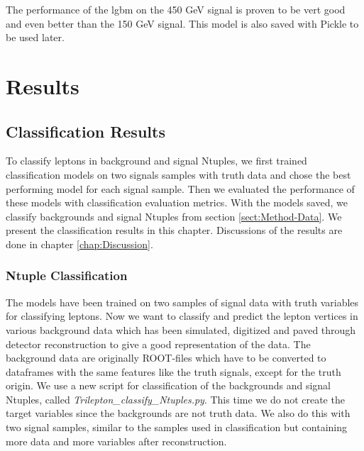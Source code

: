 \documentclass[a4paper, american, 12pt]{report}
\begin{document}
	The performance of the \acrshort{lgbm} on the 450 GeV signal is proven to be vert good and even better than the 150 GeV signal. This model is also saved with Pickle to be used later.



	\part{Results}
	\label{part:Results} 
	
	\chapter{Classification Results}
	\label{chap:Result-ClassResult}
	To classify leptons in background and signal Ntuples, we first trained classification models on two signals samples with truth data and chose the best performing model for each signal sample. Then we evaluated the performance of these models with classification evaluation metrics. With the models saved, we classify backgrounds and signal Ntuples from section \ref{sect:Method-Data}. We present the classification results in this chapter. Discussions of the results are done in chapter \ref{chap:Discussion}.
	
	
	\section{Ntuple Classification} 
	\label{sect:Result-BkgClass}
	The models have been trained on two samples of signal data with truth variables for classifying leptons. Now we want to classify and predict the lepton vertices in various background data which has been simulated, digitized and paved through detector reconstruction to give a good representation of the data. The background data are originally ROOT-files which have to be converted to dataframes with the same features like the truth signals, except for the truth origin. We use a new script for classification of the backgrounds and signal Ntuples, called \textit{Trilepton\_classify\_Ntuples.py}. This time we do not create the target variables since the backgrounds are not truth data. We also do this with two signal samples, similar to the samples used in classification but containing more data and more variables after reconstruction.
	
\end{document}
